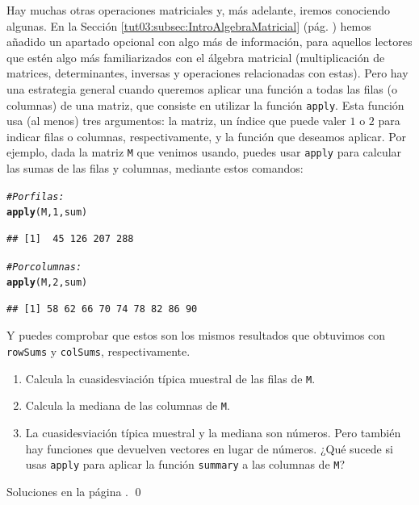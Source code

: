 \documentclass[10pt,a4paper]{article}\usepackage[]{graphicx}\usepackage[]{color}
\makeatletter
\newcommand{\hlnum}[1]{\textcolor[rgb]{0.686,0.059,0.569}{#1}}%
\newcommand{\hlcom}[1]{\textcolor[rgb]{0.678,0.584,0.686}{\textit{#1}}}%
\newcommand{\hlstd}[1]{\textcolor[rgb]{0.345,0.345,0.345}{#1}}%
\newcommand{\hlkwd}[1]{\textcolor[rgb]{0.737,0.353,0.396}{\textbf{#1}}}%
\newenvironment{kframe}{%
 \def\at@end@of@kframe{}%
 \ifinner\ifhmode%
  \def\at@end@of@kframe{\end{minipage}}%
  \begin{minipage}{\columnwidth}%
 \fi\fi%
 \def\FrameCommand##1{\hskip\@totalleftmargin \hskip-\fboxsep
 \colorbox{shadecolor}{##1}\hskip-\fboxsep
     \hskip-\linewidth \hskip-\@totalleftmargin \hskip\columnwidth}%
 \MakeFramed {\advance\hsize-\width
   \@totalleftmargin\z@ \linewidth\hsize
   \@setminipage}}%
 {\par\unskip\endMakeFramed%
 \at@end@of@kframe}
\newenvironment{knitrout}{}{} %
\makeatother
\begin{document}
Hay muchas otras operaciones matriciales y, más adelante, iremos conociendo algunas. En la Sección \ref{tut03:subsec:IntroAlgebraMatricial} (pág. \pageref{tut03:subsec:IntroAlgebraMatricial}) hemos añadido un apartado opcional con algo más de información, para aquellos lectores que estén algo más familiarizados con el álgebra matricial (multiplicación de matrices, determinantes, inversas y operaciones relacionadas con estas). Pero hay una estrategia general cuando queremos aplicar una función a todas las filas (o columnas) de una matriz, que consiste en utilizar la función {\tt apply}. Esta función usa (al menos) tres argumentos: la matriz, un índice que puede valer $1$ o $2$ para indicar filas o columnas, respectivamente, y la función que deseamos aplicar. Por ejemplo, dada la matriz {\tt M} que venimos usando, puedes usar {\tt apply} para calcular las sumas de las filas y columnas, mediante estos comandos:
\begin{knitrout}
\color{fgcolor}\begin{kframe}
\begin{alltt}
\hlcom{# Por filas:}
\hlkwd{apply}\hlstd{(M,} \hlnum{1}\hlstd{, sum)}
\end{alltt}
\begin{verbatim}
## [1]  45 126 207 288
\end{verbatim}
\begin{alltt}
\hlcom{# Por columnas:}
\hlkwd{apply}\hlstd{(M,} \hlnum{2}\hlstd{, sum)}
\end{alltt}
\begin{verbatim}
## [1] 58 62 66 70 74 78 82 86 90
\end{verbatim}
\end{kframe}
\end{knitrout}
     Y puedes comprobar que estos son los mismos resultados que obtuvimos con {\tt rowSums} y {\tt colSums}, respectivamente.
\begin{ejercicio}
\label{tut03:ejercicio07a}
\quad
\begin{enumerate}
\item Calcula la cuasidesviación típica muestral de las filas de {\tt M}.
\item Calcula la mediana de las columnas de {\tt M}.
\item La cuasidesviación típica muestral y la mediana son números. Pero también hay funciones que devuelven vectores en lugar de números. ¿Qué sucede si usas {\tt apply} para aplicar la función {\tt summary} a las columnas de {\tt M}?
\end{enumerate}
Soluciones en la página \pageref{tut03:ejercicio07a:sol}.
\qed
\end{ejercicio}
\end{document}
